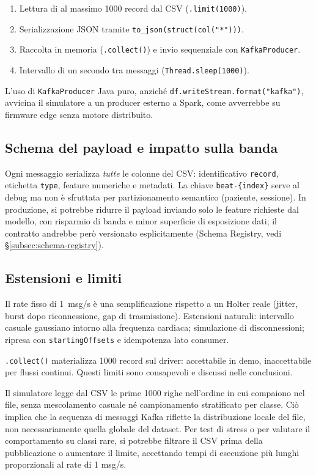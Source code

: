 \begin{enumerate}
  \item Lettura di al massimo 1000 record dal CSV (\texttt{.limit(1000)}).
  \item Serializzazione JSON tramite \texttt{to\_json(struct(col("*")))}.
  \item Raccolta in memoria (\texttt{.collect()}) e invio sequenziale con \texttt{KafkaProducer}.
  \item Intervallo di un secondo tra messaggi (\texttt{Thread.sleep(1000)}).
\end{enumerate}

L'uso di \texttt{KafkaProducer} Java puro, anziché \texttt{df.writeStream.format("kafka")}, avvicina il simulatore a un producer esterno a Spark, come avverrebbe su firmware edge senza motore distribuito.

\subsection{Schema del payload e impatto sulla banda}

Ogni messaggio serializza \emph{tutte} le colonne del CSV: identificativo \texttt{record}, etichetta \texttt{type}, feature numeriche e metadati.
La chiave \texttt{beat-\{index\}} serve al debug ma non è sfruttata per partizionamento semantico (paziente, sessione).
In produzione, si potrebbe ridurre il payload inviando solo le feature richieste dal modello, con risparmio di banda e minor superficie di esposizione dati; il contratto andrebbe però versionato esplicitamente (Schema Registry, vedi \S\ref{subsec:schema-registry}).

\subsection{Estensioni e limiti}

Il rate fisso di 1~msg/s è una semplificazione rispetto a un Holter reale (jitter, burst dopo riconnessione, gap di trasmissione).
Estensioni naturali: intervallo casuale gaussiano intorno alla frequenza cardiaca; simulazione di disconnessioni; ripresa con \texttt{startingOffsets} e idempotenza lato consumer.

\texttt{.collect()} materializza 1000 record sul driver: accettabile in demo, inaccettabile per flussi continui.
Questi limiti sono consapevoli e discussi nelle conclusioni.

Il simulatore legge dal CSV le prime 1000 righe nell'ordine in cui compaiono nel file, senza mescolamento casuale né campionamento stratificato per classe.
Ciò implica che la sequenza di messaggi Kafka riflette la distribuzione locale del file, non necessariamente quella globale del dataset.
Per test di stress o per valutare il comportamento su classi rare, si potrebbe filtrare il CSV prima della pubblicazione o aumentare il limite, accettando tempi di esecuzione più lunghi proporzionali al rate di 1 msg/s.

